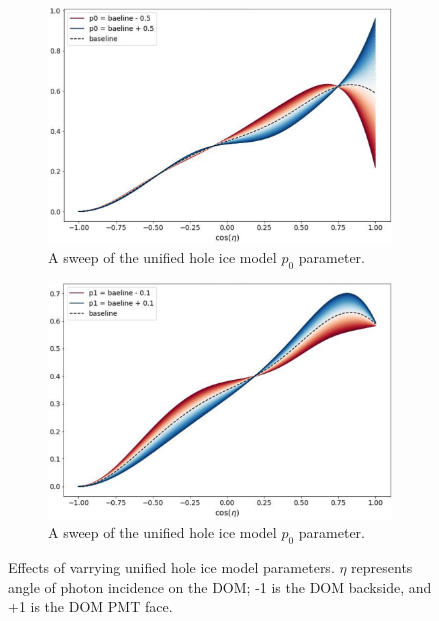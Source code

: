 \documentclass[main.tex]{subfiles}
\begin{document}
\begin{figure}
    \centering
    \begin{subfigure}{.45\textwidth}
        \centering
        \includegraphics[width=0.95\linewidth]{./figures/holeice_p0.png}
        \caption{A sweep of the unified hole ice model $p_0$ parameter.}
    \end{subfigure}%
    \begin{subfigure}{.45\textwidth}
        \centering
        \includegraphics[width=0.95\linewidth]{./figures/holeice_p1.png}
        \caption{A sweep of the unified hole ice model $p_0$ parameter.}
    \end{subfigure}
    \caption{Effects of varrying unified hole ice model parameters. $\eta$ represents angle of photon incidence on the DOM; -1 is the DOM backside, and +1 is the DOM PMT face.}\label{fig:holeiceparmas}
\end{figure}
\end{document}
